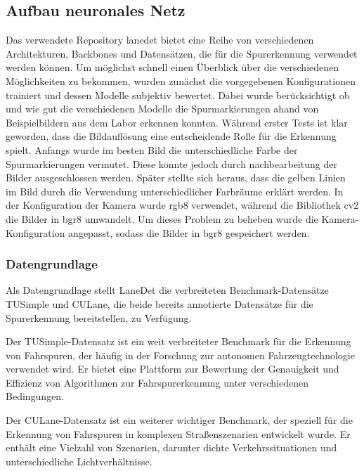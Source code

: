 \documentclass{article}
\begin{document}
        \subsection{Aufbau neuronales Netz}
            Das verwendete Repository lanedet bietet eine Reihe von verschiedenen Architekturen, Backbones und Datensätzen, die für die Spurerkennung verwendet werden können.
            Um möglichst schnell einen Überblick über die verschiedenen Möglichkeiten zu bekommen, wurden zunächst die vorgegebenen Konfigurationen trainiert und dessen Modelle subjektiv bewertet.
            Dabei wurde berücksichtigt ob und wie gut die verschiedenen Modelle die Spurmarkierungen ahand von Beispielbildern aus dem Labor erkennen konnten.
            Während erster Tests ist klar geworden, dass die Bildauflösung eine entscheidende Rolle für die Erkennung spielt. Anfangs wurde im besten Bild die unterschiedliche Farbe der Spurmarkierungen vermutet. Diese konnte jedoch durch nachbearbeitung der Bilder ausgeschlossen werden. Später stellte sich heraus, dass die gelben Linien im Bild durch die Verwendung unterschiedlicher Farbräume erklärt werden. In der Konfiguration der Kamera wurde rgb8 verwendet, während die Bibliothek cv2 die Bilder in bgr8 umwandelt. Um dieses Problem zu beheben wurde die Kamera-Konfiguration angepasst, sodass die Bilder in bgr8 gespeichert werden.

            \subsubsection{Datengrundlage}
                Als Datengrundlage stellt LaneDet die verbreiteten Benchmark-Datensätze TUSimple  und CULane, die beide bereits annotierte Datensätze für die Spurerkennung bereitstellen, zu Verfügung.
                
                Der TUSimple-Datensatz ist ein weit verbreiteter Benchmark für die Erkennung von Fahrspuren, der häufig in der Forschung zur autonomen Fahrzeugtechnologie verwendet wird. Er bietet eine Plattform zur Bewertung der Genauigkeit und Effizienz von Algorithmen zur Fahrspurerkennung unter verschiedenen Bedingungen.
                \cite{Long2021The} \cite{Lee2021Robust} \cite{Liu2024Fast}

                Der CULane-Datensatz ist ein weiterer wichtiger Benchmark, der speziell für die Erkennung von Fahrspuren in komplexen Straßenszenarien entwickelt wurde. Er enthält eine Vielzahl von Szenarien, darunter dichte Verkehrssituationen und unterschiedliche Lichtverhältnisse.
                \cite{Long2021The} \cite{Lee2021Robust} \cite{Zhou2024Unsupervised}
\end{document}
